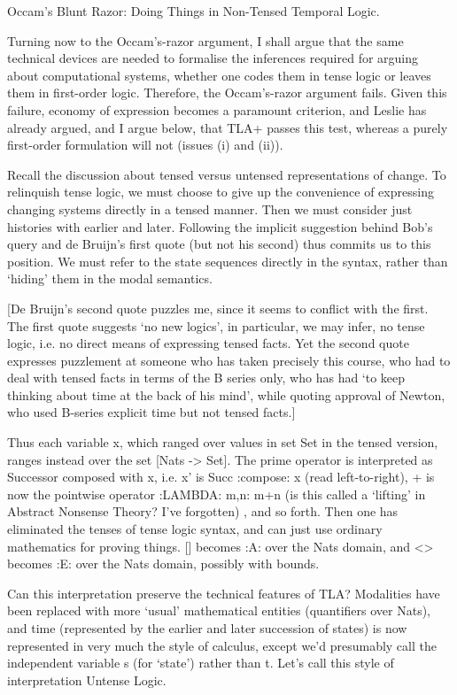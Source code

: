 \begin{spec}
Occam's Blunt Razor: Doing Things in Non-Tensed Temporal Logic.

Turning now to the Occam's-razor argument, I shall argue that the
same technical devices are needed to formalise the inferences
required for arguing about computational systems, whether one codes
them in tense logic or leaves them in first-order logic. Therefore,
the Occam's-razor argument fails.  Given this failure, economy of
expression becomes a paramount criterion, and Leslie has already
argued, and I argue below, that TLA+ passes this test, whereas a
purely first-order formulation will not (issues (i) and (ii)).

Recall the discussion about tensed versus untensed representations
of change.  To relinquish tense logic, we must choose to give up
the convenience of expressing changing systems directly in a tensed
manner.  Then we must consider just histories with earlier and
later.  Following the implicit suggestion behind Bob's query and de
Bruijn's first quote (but not his second) thus commits us to this
position.  We must refer to the state sequences directly in the
syntax, rather than `hiding' them in the modal semantics.

[De Bruijn's second quote puzzles me, since it seems to conflict
with the first. The first quote suggests `no new logics', in
particular, we may infer, no tense logic, i.e. no direct means of
expressing tensed facts.  Yet the second quote expresses puzzlement
at someone who has taken precisely this course, who had to deal with
tensed facts in terms of the B series only, who has had `to keep
thinking about time at the back of his mind', while quoting approval
of Newton, who used B-series explicit time but not tensed facts.]

Thus each variable x, which ranged over values in set Set in the
tensed version, ranges instead over the set [Nats -> Set]. The prime
operator is interpreted as Successor composed with x, i.e.  x' is
Succ :compose: x (read left-to-right), + is now the pointwise
operator :LAMBDA: m,n: m+n (is this called a `lifting' in Abstract
Nonsense Theory? I've forgotten) , and so forth. Then one has
eliminated the tenses of tense logic syntax, and can just use
ordinary mathematics for proving things.  [] becomes :A: over the
Nats domain, and <> becomes :E: over the Nats domain, possibly with
bounds.

Can this interpretation preserve the technical features of TLA?
Modalities have been replaced with more `usual' mathematical
entities (quantifiers over Nats), and time (represented by the
earlier and later succession of states) is now represented in very
much the style of calculus, except we'd presumably call the
independent variable s (for `state') rather than t.  Let's call this
style of interpretation Untense Logic.


\end{spec}
